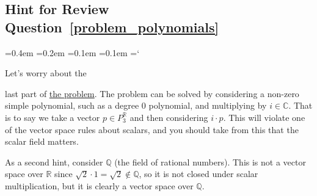 
\subsection*{Hint for Review Question~\ref{problem_polynomials}}

{\ttfamily
{}\font=0.4em
\font=0.2em
\font=0.1em
\font=0.1em
\hyphenchar\font=`\-

\hypertarget{scripts_vector_spaces_hint}{Let's worry about the} last part of \hyperref[problem_polynomials]{the problem}. The problem can be solved by considering a non-zero simple polynomial, such as a degree 0 polynomial, and multiplying by $i \in \mathbb{C}$. That is to say we take a vector $p \in P_3^{\mathbb{R}}$ and then considering $i \cdot p$. This will violate one of the vector space rules about scalars, and you should take from this that the scalar field matters.

As a second hint, consider $\mathbb{Q}$ (the field of rational numbers). This is not a vector space over $\mathbb{R}$ since $\sqrt{2} \cdot 1 = \sqrt{2} \notin \mathbb{Q}$, so it is not closed under scalar multiplication, but it is clearly a vector space over $\mathbb{Q}$.

} %

